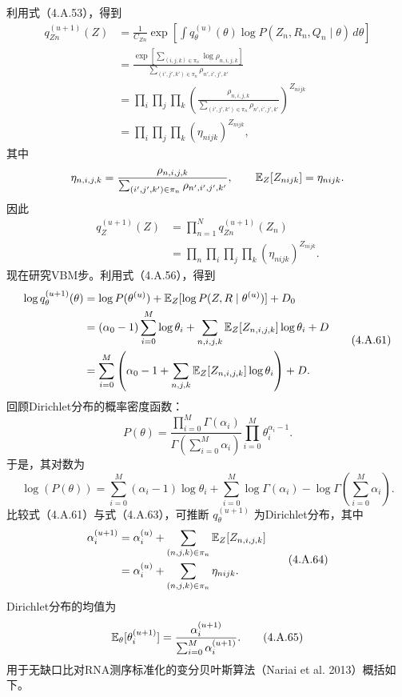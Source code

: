 利用式（4.A.53），得到
\begin{equation}
\begin{aligned}
q_{Zn}^{(u+1)}(Z)
&=\frac1{C_{Zn}}\exp\left[\int q_\theta^{(u)}(\theta)
 \log P(Z_n,R_n,Q_n\mid\theta)\,d\theta\right]\\
&=\frac{\exp[\sum_{(i,j,k)\in\pi_n}\log\rho_{n,i,j,k}]}{
 \sum_{(i',j',k')\in\pi_n}\rho_{n',i',j',k'}}\\
&=\prod_i\prod_j\prod_k
 \left(\frac{\rho_{n,i,j,k}}{\sum_{(i',j',k')\in\pi_n}\rho_{n',i',j',k'}}\right)^{Z_{nijk}}\\
&=\prod_i\prod_j\prod_k(\eta_{nijk})^{Z_{nijk}},
\end{aligned}\tag{4.A.59}
\end{equation}
其中
\[
\eta_{n,i,j,k}=\frac{\rho_{n,i,j,k}}{\sum_{(i',j',k')\in\pi_n}\rho_{n',i',j',k'}},
\qquad \mathbb{E}_Z[Z_{nijk}]=\eta_{nijk}.
\]
因此
\begin{equation}
\begin{aligned}
q_Z^{(u+1)}(Z)&=\prod_{n=1}^{N}q_{Zn}^{(u+1)}(Z_n)\\
&=\prod_n\prod_i\prod_j\prod_k(\eta_{nijk})^{Z_{nijk}}.
\end{aligned}\tag{4.A.60}
\end{equation}
现在研究VBM步。利用式（4.A.56），得到
\begin{equation}
\begin{aligned}
\log q_\theta^{(u+1)}(\theta)
&=\log P(\theta^{(u)})+\mathbb{E}_Z[\log P(Z,R\mid\theta^{(u)})]+D_0\\
&=(\alpha_0-1)\sum_{i=0}^{M}\log\theta_i
 +\sum_{n,i,j,k}\mathbb{E}_Z[Z_{n,i,j,k}]\log\theta_i+D\\
&=\sum_{i=0}^{M}\left(\alpha_0-1+
 \sum_{n,j,k}\mathbb{E}_Z[Z_{n,i,j,k}]\log\theta_i\right)+D.
\end{aligned}\tag{4.A.61}
\end{equation}
回顾Dirichlet分布的概率密度函数：
\begin{equation}
P(\theta)=\frac{\prod_{i=0}^{M}\Gamma(\alpha_i)}{
\Gamma(\sum_{i=0}^{M}\alpha_i)}\prod_{i=0}^{M}\theta_i^{\alpha_i-1}.\tag{4.A.62}
\end{equation}
于是，其对数为
\begin{equation}
\log(P(\theta))=\sum_{i=0}^{M}(\alpha_i-1)\log\theta_i
+\sum_{i=0}^{M}\log\Gamma(\alpha_i)
-\log\Gamma\left(\sum_{i=0}^{M}\alpha_i\right).\tag{4.A.63}
\end{equation}
比较式（4.A.61）与式（4.A.63），可推断 $q_\theta^{(u+1)}$ 为Dirichlet分布，其中
\begin{equation}
\begin{aligned}
\alpha_i^{(u+1)}&=\alpha_i^{(u)}+
 \sum_{(n,j,k)\in\pi_n}\mathbb{E}_Z[Z_{n,i,j,k}]\\
&=\alpha_i^{(u)}+\sum_{(n,j,k)\in\pi_n}\eta_{nijk}.
\end{aligned}\tag{4.A.64}
\end{equation}
Dirichlet分布的均值为
\begin{equation}
\mathbb{E}_\theta[\theta_i^{(u+1)}]=\frac{\alpha_i^{(u+1)}}{
\sum_{i=0}^{M}\alpha_i^{(u+1)}}.\tag{4.A.65}
\end{equation}
用于无缺口比对RNA测序标准化的变分贝叶斯算法（Nariai et al. 2013）概括如下。

